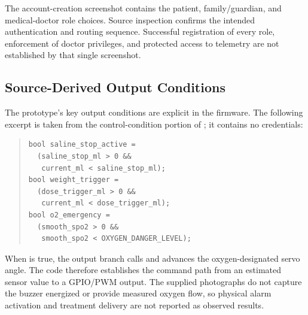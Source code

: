 The account-creation screenshot contains the patient, family/guardian, and medical-doctor role choices. Source inspection confirms the intended authentication and routing sequence. Successful registration of every role, enforcement of doctor privileges, and protected access to telemetry are not established by that single screenshot.

\subsection{Source-Derived Output Conditions}
The prototype's key output conditions are explicit in the firmware. The following excerpt is taken from the control-condition portion of ; it contains no credentials:
\begin{quote}\footnotesize
\begin{verbatim}
bool saline_stop_active =
  (saline_stop_ml > 0 &&
   current_ml < saline_stop_ml);
bool weight_trigger =
  (dose_trigger_ml > 0 &&
   current_ml < dose_trigger_ml);
bool o2_emergency =
  (smooth_spo2 > 0 &&
   smooth_spo2 < OXYGEN_DANGER_LEVEL);
\end{verbatim}
\end{quote}
When  is true, the output branch calls  and advances the oxygen-designated servo angle. The code therefore establishes the command path from an estimated sensor value to a GPIO/PWM output. The supplied photographs do not capture the buzzer energized or provide measured oxygen flow, so physical alarm activation and treatment delivery are not reported as observed results.

